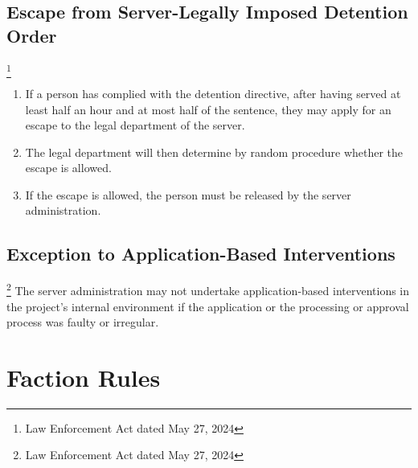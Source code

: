\documentclass{article}
\begin{document}
\subsection{Escape from Server-Legally Imposed Detention Order}\footnote{Law Enforcement Act dated May 27, 2024}
\begin{enumerate}[(1)]
	\item If a person has complied with the detention directive, after having served at least half an hour and at most half of the sentence, they may apply for an escape to the legal department of the server.
	\item The legal department will then determine by random procedure whether the escape is allowed.
	\item If the escape is allowed, the person must be released by the server administration.
\end{enumerate}

\subsection{Exception to Application-Based Interventions}\footnote{Law Enforcement Act dated May 27, 2024}
The server administration may not undertake application-based interventions in the project’s internal environment if the application or the processing or approval process was faulty or irregular.

\section{Faction Rules}
\end{document}
